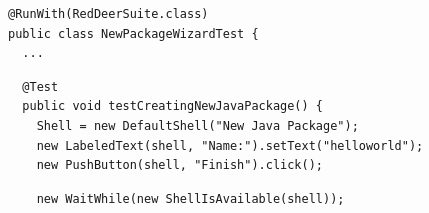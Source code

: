 \documentclass{beamer}
\begin{document}
\begin{frame}[fragile]
\begin{lstlisting}
@RunWith(RedDeerSuite.class)
public class NewPackageWizardTest {
  ...
\end{lstlisting}
\pause
\begin{lstlisting}
  @Test
  public void testCreatingNewJavaPackage() {    
    Shell = new DefaultShell("New Java Package");
    new LabeledText(shell, "Name:").setText("helloworld");
    new PushButton(shell, "Finish").click();
\end{lstlisting}
\pause
\begin{lstlisting}
    new WaitWhile(new ShellIsAvailable(shell));
\end{lstlisting}
\end{frame}





%
%
%  
%
\end{document}

